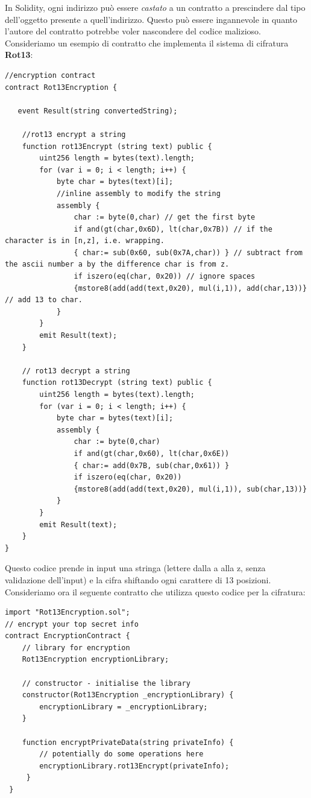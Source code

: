 In Solidity, ogni indirizzo può essere \textit{castato} a un contratto a prescindere dal tipo dell'oggetto presente a quell'indirizzo. Questo può essere ingannevole in quanto l'autore del contratto potrebbe voler nascondere del codice malizioso. Consideriamo un esempio di contratto che implementa il sistema di cifratura \textbf{Rot13}:
\begin{lstlisting}[language=Solidity]
//encryption contract
contract Rot13Encryption {
     
   event Result(string convertedString);
   
    //rot13 encrypt a string
    function rot13Encrypt (string text) public {
        uint256 length = bytes(text).length;
        for (var i = 0; i < length; i++) {
            byte char = bytes(text)[i];
            //inline assembly to modify the string
            assembly {
                char := byte(0,char) // get the first byte
                if and(gt(char,0x6D), lt(char,0x7B)) // if the character is in [n,z], i.e. wrapping. 
                { char:= sub(0x60, sub(0x7A,char)) } // subtract from the ascii number a by the difference char is from z. 
                if iszero(eq(char, 0x20)) // ignore spaces
                {mstore8(add(add(text,0x20), mul(i,1)), add(char,13))} // add 13 to char. 
            }
        }
        emit Result(text);
    }
    
    // rot13 decrypt a string
    function rot13Decrypt (string text) public {
        uint256 length = bytes(text).length;
        for (var i = 0; i < length; i++) {
            byte char = bytes(text)[i];
            assembly {
                char := byte(0,char)
                if and(gt(char,0x60), lt(char,0x6E))
                { char:= add(0x7B, sub(char,0x61)) }
                if iszero(eq(char, 0x20))
                {mstore8(add(add(text,0x20), mul(i,1)), sub(char,13))}
            }
        }
        emit Result(text);
    }
}
\end{lstlisting}
Questo codice prende in input una stringa (lettere dalla a alla z, senza validazione dell'input) e la cifra shiftando ogni carattere di 13 posizioni. Consideriamo ora il seguente contratto che utilizza questo codice per la cifratura:
\begin{lstlisting}[language=Solidity]
import "Rot13Encryption.sol";
// encrypt your top secret info
contract EncryptionContract {
    // library for encryption
    Rot13Encryption encryptionLibrary;
        
    // constructor - initialise the library
    constructor(Rot13Encryption _encryptionLibrary) {
        encryptionLibrary = _encryptionLibrary;
    }
    
    function encryptPrivateData(string privateInfo) {
        // potentially do some operations here
        encryptionLibrary.rot13Encrypt(privateInfo);
     }
 }
\end{lstlisting}
